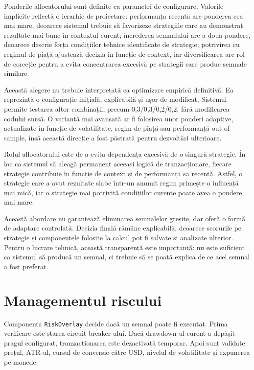 Ponderile allocatorului sunt definite ca parametri de configurare. Valorile implicite reflectă o ierarhie de proiectare: performanța recentă are ponderea cea mai mare, deoarece sistemul trebuie să favorizeze strategiile care au demonstrat rezultate mai bune în contextul curent; încrederea semnalului are a doua pondere, deoarece descrie forța condițiilor tehnice identificate de strategie; potrivirea cu regimul de piață ajustează decizia în funcție de context, iar diversificarea are rol de corecție pentru a evita concentrarea excesivă pe strategii care produc semnale similare.

Această alegere nu trebuie interpretată ca optimizare empirică definitivă. Ea reprezintă o configurație inițială, explicabilă și ușor de modificat. Sistemul permite testarea altor combinații, precum 0,3/0,3/0,2/0,2, fără modificarea codului sursă. O variantă mai avansată ar fi folosirea unor ponderi adaptive, actualizate în funcție de volatilitate, regim de piață sau performanță out-of-sample, însă această direcție a fost păstrată pentru dezvoltări ulterioare.

Rolul allocatorului este de a evita dependența excesivă de o singură strategie. În loc ca sistemul să aleagă permanent aceeași logică de tranzacționare, fiecare strategie contribuie în funcție de context și de performanța sa recentă. Astfel, o strategie care a avut rezultate slabe într-un anumit regim primește o influență mai mică, iar o strategie mai potrivită condițiilor curente poate avea o pondere mai mare.

Această abordare nu garantează eliminarea semnalelor greșite, dar oferă o formă de adaptare controlată. Decizia finală rămâne explicabilă, deoarece scorurile pe strategie și componentele folosite la calcul pot fi salvate și analizate ulterior. Pentru o lucrare tehnică, această transparență este importantă: nu este suficient ca sistemul să producă un semnal, ci trebuie să se poată explica de ce acel semnal a fost preferat.

\section{Managementul riscului}
\label{cap:cap3:risk_overlay}

Componenta \texttt{RiskOverlay} decide dacă un semnal poate fi executat. Prima verificare este starea circuit breaker-ului. Dacă drawdown-ul curent a depășit pragul configurat, tranzacționarea este dezactivată temporar. Apoi sunt validate prețul, ATR-ul, cursul de conversie către USD, nivelul de volatilitate și expunerea pe monede.

